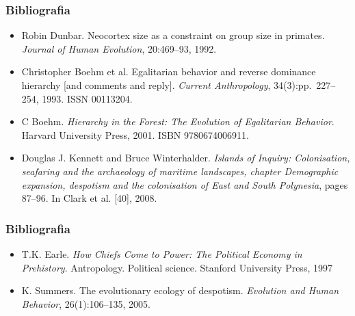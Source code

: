 \documentclass[ignorenonframetext,]{beamer}
\begin{document}
\begin{frame}\frametitle{Bibliografia}

\begin{itemize}
\itemsep1pt\parskip0pt
\item
  Robin Dunbar. Neocortex size as a constraint on group size in
  primates. \emph{Journal of Human Evolution}, 20:469--93, 1992.
\item
  Christopher Boehm et al. Egalitarian behavior and reverse dominance
  hierarchy {[}and comments and reply{]}. \emph{Current Anthropology},
  34(3):pp.~227--254, 1993. ISSN 00113204.
\item
  C Boehm. \emph{Hierarchy in the Forest: The Evolution of Egalitarian
  Behavior}. Harvard University Press, 2001. ISBN 9780674006911.
\item
  Douglas J. Kennett and Bruce Winterhalder. \emph{Islands of Inquiry:
  Colonisation, seafaring and the archaeology of maritime landscapes,
  chapter Demographic expansion, despotism and the colonisation of East
  and South Polynesia}, pages 87--96. In Clark et al. {[}40{]}, 2008.
\end{itemize}

\end{frame}

\begin{frame}\frametitle{Bibliografia}

\begin{itemize}
\itemsep1pt\parskip0pt
\item
  T.K. Earle. \emph{How Chiefs Come to Power: The Political Economy in
  Prehistory}. Antropology. Political science. Stanford University
  Press, 1997
\item
  K. Summers. The evolutionary ecology of despotism. \emph{Evolution and
  Human Behavior}, 26(1):106--135, 2005.
\end{itemize}

\end{frame}

\printbibliography
\end{document}
